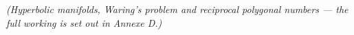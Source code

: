 % 
% 
% 
% 
% 
% 
% 
% 
\textit{(Hyperbolic manifolds, Waring's problem and reciprocal polygonal numbers --- the full working is set out in Annexe D.)}

